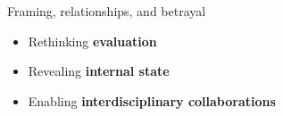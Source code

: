 \documentclass[xcolor=dvipsnames]{beamer}
\begin{document}
\begin{frame}[plain]

\end{frame}


%

        \begin{frame}{Framing, relationships, and betrayal}

           \begin{itemize}
              \item Rethinking {\bf evaluation}
                \item Revealing {\bf internal state}
                    \item Enabling {\bf interdisciplinary collaborations}
            \end{itemize}

\end{frame}
\end{document}
